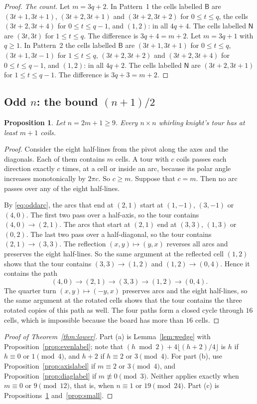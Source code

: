 \documentclass[11pt]{amsart}
\newtheorem{proposition}[theorem]{Proposition}
\theoremstyle{remark}
\begin{document}
\begin{proof}
\emph{The count.} Let $m=3q+2$. In Pattern~1 the cells labelled $\mathsf B$ are $(3t+1,3t+1)$, $(3t+2,3t+1)$ and
$(3t+2,3t+2)$ for $0\le t\le q$, the cells $(3t+2,3t+4)$ for $0\le t\le q-1$, and $(1,2)$: in all $4q+4$. The cells
labelled $\mathsf N$ are $(3t,3t)$ for $1\le t\le q$. The difference is $3q+4=m+2$. Let $m=3q+1$ with $q\ge1$. In Pattern~2 the
cells labelled $\mathsf B$ are $(3t+1,3t+1)$ for $0\le t\le q$, $(3t+1,3t-1)$ for $1\le t\le q$, $(3t+2,3t+2)$ and
$(3t+2,3t+4)$ for $0\le t\le q-1$, and $(1,2)$: in all $4q+2$. The cells labelled $\mathsf N$ are $(3t+2,3t+1)$ for
$1\le t\le q-1$. The difference is $3q+3=m+2$.
\end{proof}

\subsection*{Odd $n$: the bound $(n+1)/2$}
\begin{proposition}\label{prop:oddhalf}
Let $n=2m+1\ge9$. Every $n\times n$ whirling knight's tour has at least $m+1$ coils.
\end{proposition}
\begin{proof}
Consider the eight half-lines from the pivot along the axes and the diagonals. Each of them contains $m$ cells. A
tour with $c$ coils passes each direction exactly $c$ times, at a cell or inside an arc, because its polar angle
increases monotonically by $2\pi c$. So $c\ge m$. Suppose that $c=m$. Then no arc passes over any of the eight
half-lines.

By \eqref{eq:oddarc}, the arcs that end at $(2,1)$ start at $(1,-1)$, $(3,-1)$ or $(4,0)$. The first two pass over a
half-axis, so the tour contains $(4,0)\to(2,1)$. The arcs that start at $(2,1)$ end at $(3,3)$, $(1,3)$ or $(0,2)$.
The last two pass over a half-diagonal, so the tour contains $(2,1)\to(3,3)$. The reflection $(x,y)\mapsto(y,x)$
reverses all arcs and preserves the eight half-lines. So the same argument at the reflected cell $(1,2)$ shows that
the tour contains $(3,3)\to(1,2)$ and $(1,2)\to(0,4)$. Hence it contains the path
\[ (4,0)\to(2,1)\to(3,3)\to(1,2)\to(0,4). \]
The quarter turn $(x,y)\mapsto(-y,x)$ preserves arcs and the eight half-lines, so the same argument at the rotated
cells shows that the tour contains the three rotated copies of this path as well. The four paths form a closed cycle through $16$ cells, which is impossible
because the board has more than $16$ cells.
\end{proof}

\begin{proof}[Proof of Theorem~\ref{thm:lower}]
Part (a) is Lemma~\ref{lem:wedge} with Proposition~\ref{prop:evenlabel}; note that
$(h\bmod2)+4\lfloor(h+2)/4\rfloor$ is $h$ if $h\equiv0$ or $1\pmod4$, and $h+2$ if $h\equiv2$ or $3\pmod4$. For
part (b), use Proposition~\ref{prop:axislabel} if $m\equiv2$ or $3\pmod4$, and Proposition~\ref{prop:diaglabel} if
$m\not\equiv0\pmod3$. Neither applies exactly when $m\equiv0$ or $9\pmod{12}$, that is, when $n\equiv1$ or
$19\pmod{24}$. Part (c) is Propositions~\ref{prop:oddhalf} and~\ref{prop:small}.
\end{proof}
\end{document}
